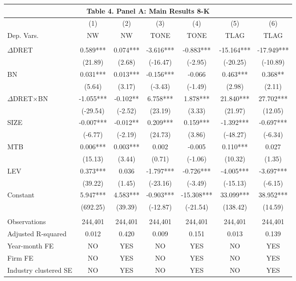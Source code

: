 \begin{table}[htbp] \label{T4PA}
  \centering
    \begin{tabular}{lcccccc}
    \multicolumn{7}{c}{\textbf{Table 4. Panel A: Main Results 8-K}} \\
    \midrule
      & (1) & (2) & (3) & (4) & (5) & (6) \\
    Dep. Vars. & NW & NW & TONE & TONE & TLAG & TLAG \\
    \midrule
      &   &   &   &   &   &  \\
    $\Delta$DRET & 0.589*** & 0.074*** & -3.616*** & -0.883*** & -15.164*** & -17.949*** \\
      & (21.89) & (2.68) & (-16.47) & (-2.95) & (-20.25) & (-10.89) \\
    BN & 0.031*** & 0.013*** & -0.156*** & -0.066 & 0.463*** & 0.368** \\
      & (5.64) & (3.17) & (-3.43) & (-1.49) & (2.98) & (2.11) \\
    \rowcolor[rgb]{ .933,  .925,  .882} $\Delta$DRET$\times$BN & -1.055*** & -0.102** & 6.758*** & 1.878*** & 21.840*** & 27.702*** \\
    \rowcolor[rgb]{ .933,  .925,  .882}   & (-29.54) & (-2.52) & (23.19) & (3.33) & (21.97) & (12.05) \\
    SIZE & -0.007*** & -0.012** & 0.209*** & 0.159*** & -1.392*** & -0.697*** \\
      & (-6.77) & (-2.19) & (24.73) & (3.86) & (-48.27) & (-6.34) \\
    MTB & 0.006*** & 0.003*** & 0.002 & -0.005 & 0.110*** & 0.027 \\
      & (15.13) & (3.44) & (0.71) & (-1.06) & (10.32) & (1.35) \\
    LEV & 0.373*** & 0.036 & -1.797*** & -0.726*** & -4.005*** & -3.697*** \\
      & (39.22) & (1.45) & (-23.16) & (-3.49) & (-15.13) & (-6.15) \\
    Constant & 5.947*** & 4.583*** & -0.903*** & -15.308*** & 33.099*** & 38.952*** \\
      & (692.25) & (39.39) & (-12.87) & (-21.54) & (138.42) & (14.59) \\
      &   &   &   &   &   &  \\
    Observations & 244,401 & 244,401 & 244,401 & 244,401 & 244,401 & 244,401 \\
    Adjusted R-squared & 0.012 & 0.420 & 0.009 & 0.151 & 0.013 & 0.139 \\
    Year-month FE & NO & YES & NO & YES & NO & YES \\
    Firm FE & NO & YES & NO & YES & NO & YES \\
    Industry clustered SE & NO & YES & NO & YES & NO & YES \\
    \bottomrule
    \end{tabular}%
\end{table}%
